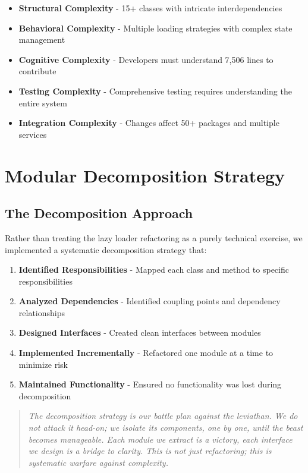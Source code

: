 \documentclass[11pt]{article}
\begin{document}
\begin{itemize}
\item \textbf{Structural Complexity} - 15+ classes with intricate interdependencies
\item \textbf{Behavioral Complexity} - Multiple loading strategies with complex state management
\item \textbf{Cognitive Complexity} - Developers must understand 7,506 lines to contribute
\item \textbf{Testing Complexity} - Comprehensive testing requires understanding the entire system
\item \textbf{Integration Complexity} - Changes affect 50+ packages and multiple services
\end{itemize}

\section{Modular Decomposition Strategy}

\subsection{The Decomposition Approach}

Rather than treating the lazy loader refactoring as a purely technical exercise, we implemented a systematic decomposition strategy that:

\begin{enumerate}
\item \textbf{Identified Responsibilities} - Mapped each class and method to specific responsibilities
\item \textbf{Analyzed Dependencies} - Identified coupling points and dependency relationships
\item \textbf{Designed Interfaces} - Created clean interfaces between modules
\item \textbf{Implemented Incrementally} - Refactored one module at a time to minimize risk
\item \textbf{Maintained Functionality} - Ensured no functionality was lost during decomposition
\end{enumerate}

\begin{quote}
\emph{The decomposition strategy is our battle plan against the leviathan. We do not attack it head-on; we isolate its components, one by one, until the beast becomes manageable. Each module we extract is a victory, each interface we design is a bridge to clarity. This is not just refactoring; this is systematic warfare against complexity.}
\end{quote}
\end{document}
